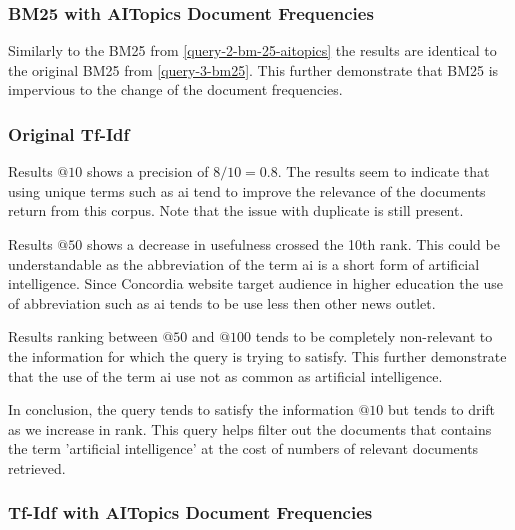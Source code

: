 \subsubsection{BM25 with AITopics Document Frequencies}\label{query-3-bm25-aitopics}

\par Similarly to the BM25 from \ref{query-2-bm-25-aitopics} the results are identical to the original BM25 from \ref{query-3-bm25}. This further demonstrate that BM25 is impervious to the change of the document frequencies.

\subsubsection{Original Tf-Idf}\label{query-3-tf-idf}

\par Results $@10$ shows a precision of $8/10=0.8$. The results seem to indicate that using unique terms such as ai tend to improve the relevance of the documents return from this corpus. Note that the issue with duplicate is still present.
\par Results $@50$ shows a decrease in usefulness crossed the 10th rank. This could be understandable as the abbreviation of the term ai is a short form of artificial intelligence. Since Concordia website target audience in higher education the use of abbreviation such as ai tends to be use less then other news outlet.
\par Results ranking between $@50$ and $@100$ tends to be completely non-relevant to the information for which the query is trying to satisfy. This further demonstrate that the use of the term ai use not as common as artificial intelligence. 
\par In conclusion, the query tends to satisfy the information $@10$ but tends to drift as we increase in rank. This query helps filter out the documents that contains the term 'artificial intelligence' at the cost of numbers of relevant documents retrieved.

\subsubsection{Tf-Idf with AITopics Document Frequencies} \label{query-3-tf-idf-aitopics}

